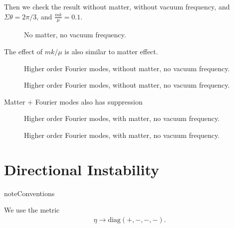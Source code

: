 \documentclass[letterpaper,12pt,english]{sphinxmanual}
\begin{document}
Then we check the result without matter, without vacuum frequency, and \(\Sigma\theta=2\pi/3\), and \(\frac{m k}{\mu}=0.1\).
\begin{figure}[htbp]
\centering
\capstart

\noindent{}
\caption{No matter, no vacuum frequency.}\label{\detokenize{collective/fast-modes:id8}}\end{figure}

The effect of \(m k/\mu\) is also similar to matter effect.
\begin{figure}[htbp]
\centering
\capstart

\noindent{}
\caption{Higher order Fourier modes, without matter, no vacuum frequency.}\label{\detokenize{collective/fast-modes:id9}}\end{figure}
\begin{figure}[htbp]
\centering
\capstart

\noindent{}
\caption{Higher order Fourier modes, without matter, no vacuum frequency.}\label{\detokenize{collective/fast-modes:id10}}\end{figure}

Matter + Fourier modes also has suppression
\begin{figure}[htbp]
\centering
\capstart

\noindent{}
\caption{Higher order Fourier modes, with matter, no vacuum frequency.}\label{\detokenize{collective/fast-modes:id11}}\end{figure}
\begin{figure}[htbp]
\centering
\capstart

\noindent{}
\caption{Higher order Fourier modes, with matter, no vacuum frequency.}\label{\detokenize{collective/fast-modes:id12}}\end{figure}


\section{Directional Instability}
\label{\detokenize{collective/directional-instability::doc}}\label{\detokenize{collective/directional-instability:directional-instability}}
\begin{sphinxadmonition}{note}{Conventions}

We use the metric
\begin{equation*}
\begin{split}\eta \to \mathrm{diag}(+,-,-,-).\end{split}
\end{equation*}\end{sphinxadmonition}
\end{document}
